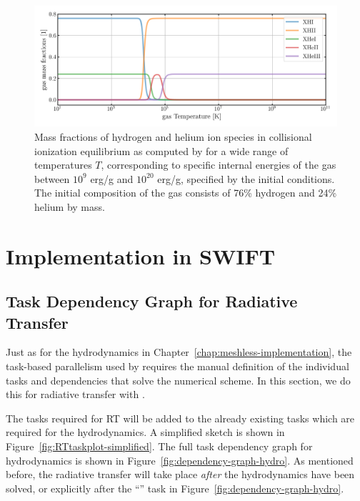 \begin{figure}
 \centering
 \includegraphics[width=.8\textwidth]{figures/RHD/ionization_equilibrium.png}
 \caption{
Mass fractions of hydrogen and helium ion species in collisional ionization equilibrium  as
computed by \GEARRT for a wide range of temperatures $T$, corresponding to specific internal
energies of the gas between $10^9$ erg/g and $10^{20}$ erg/g, specified by the initial conditions.
The initial composition of the gas consists of 76\% hydrogen and 24\% helium by
mass.
 }
 \label{fig:ionization-equilibrium}
\end{figure}













\section{Implementation in SWIFT}\label{chap:rt-implementation}

\subsection{Task Dependency Graph for Radiative Transfer}

Just as for the hydrodynamics in Chapter~\ref{chap:meshless-implementation}, the task-based
parallelism used by \swift requires the manual definition of the individual tasks and dependencies
that solve the numerical scheme. In this section, we do this for radiative transfer with \GEARRT.

The tasks required for RT will be added to the already existing tasks which are required for the
hydrodynamics. A simplified sketch is shown in Figure~\ref{fig:RTtaskplot-simplified}. The full
task dependency graph for hydrodynamics is shown in Figure~\ref{fig:dependency-graph-hydro}. As
mentioned before, the radiative transfer will take place \emph{after} the hydrodynamics have been
solved, or explicitly after the ``'' task in Figure~\ref{fig:dependency-graph-hydro}.

